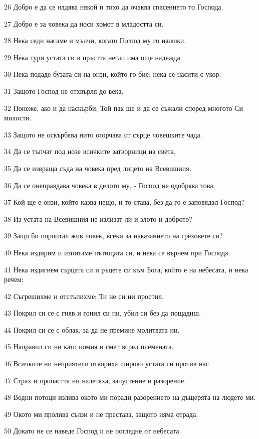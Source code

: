 \par 26 Добро е да се надява някой и тихо да очаква спасението то Господа.
\par 27 Добро е за човека да носи хомот в младостта си.
\par 28 Нека седи насаме и мълчи, когато Господ му го наложи.
\par 29 Нека тури устата си в пръстта негли има още надежда.
\par 30 Нека подаде бузата си на онзи, който го бие; нека се насити с укор.
\par 31 Защото Господ не отхвърля до века.
\par 32 Понеже, ако и да наскърби, Той пак ще и да се съжали според многото Си милости.
\par 33 Защото не оскърбява нито огорчава от сърце човешките чада.
\par 34 Да се тъпчат под нозе всичките затворници на света,
\par 35 Да се извраща съда на човека пред лицето на Всевишния,
\par 36 Да се онеправдава човека в делото му, - Господ не одобрява това.
\par 37 Кой ще е онзи, който казва нещо, и то става, без да го е заповядал Господ?
\par 38 Из устата на Всевишния не излизат ли и злото и доброто?
\par 39 Защо би пороптал жив човек, всеки за наказанието на греховете си?
\par 40 Нека издирим и изпитаме пътищата си, и нека се върнем при Господа.
\par 41 Нека издигнем сърцата си и ръцете си към Бога, който е на небесата, и нека речем:
\par 42 Съгрешихме и отстъпихме; Ти не си ни простил.
\par 43 Покрил си се с гняв и гонил си ни, убил си без да пощадиш.
\par 44 Покрил си се с облак, за да не премине молитвата ни.
\par 45 Направил си ни като помия и смет всред племената.
\par 46 Всичките ни неприятели отвориха широко устата си против нас.
\par 47 Страх и пропастта ни налетяха, запустение и разорение.
\par 48 Водни потоци излива окото ми поради разорението на дъщерята на людете ми.
\par 49 Окото ми пролива сълзи и не престава, защото няма отрада.
\par 50 Докато не се наведе Господ и не погледне от небесата.

